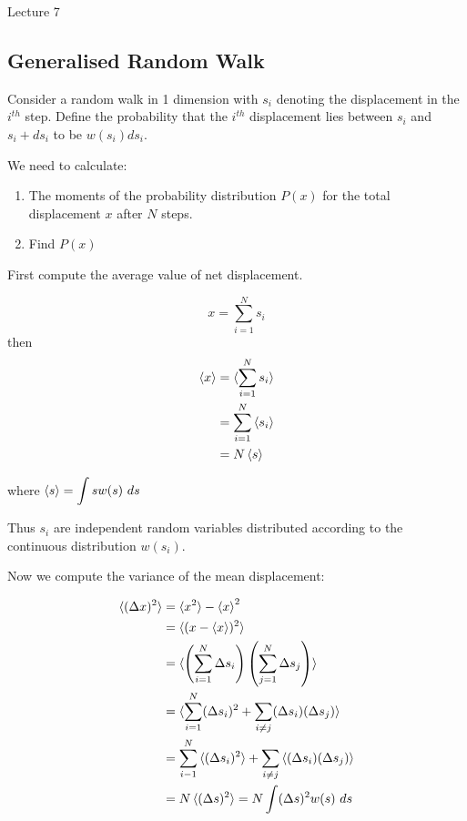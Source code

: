 \begin{center}

Lecture 7

\end{center}

\subsection{Generalised Random Walk}

Consider a random walk in 1 dimension with $s_i$ denoting the displacement in the $i^{th}$ step. Define the probability that the $i^{th}$ displacement lies between $s_i$ and $s_i + ds_i$ to be $w (s_i) ds_i$.

We need to calculate:

\begin{enumerate}
\item The moments of the probability distribution $P(x)$ for the total displacement $x$ after $N$ steps.
\item Find $P(x)$
\end{enumerate}

First compute the average value of net displacement.

$$x = \sum_{i=1}^N s_i$$ then 
\begin{align*}
\braket{x} &= \braket{\sum_{i=1}^N s_i} \\
&= \sum_{i=1}^N \braket{s_i} \\
&= N \braket{s}
\end{align*}

\noindent where $\braket{s} = \displaystyle \int s w(s) \,\, ds$

Thus $s_i$ are independent random variables distributed according to the continuous distribution $w(s_i)$.

Now we compute the variance of the mean displacement:

\begin{align*}
\braket{(\Delta x)^2} &= \braket{x^2} - \braket{x}^2 \\
&= \braket{(x - \braket{x})^2} \\
&= \braket{\left(\sum_{i=1}^N \Delta s_i\right)\left(\sum_{j=1}^N \Delta s_j\right)} \\
&= \braket{\sum_{i=1}^N (\Delta s_i)^2 + \sum_{i \neq j} (\Delta s_i) (\Delta s_j)} \\
&= \sum_{i-1}^N \braket{(\Delta s_i)^2} + \sum_{i \neq j} \braket{(\Delta s_i) (\Delta s_j)} \\
&= N \braket{(\Delta s)^2} = N \int (\Delta s)^2 w(s) \, \, ds
\end{align*}

